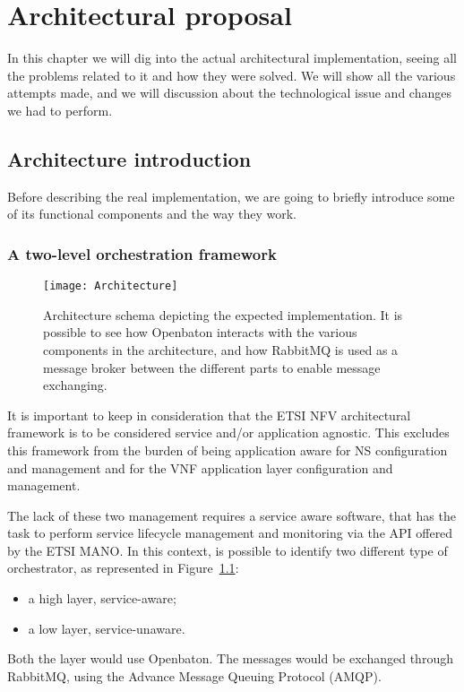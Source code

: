 \chapter{Architectural proposal}
\label{chap:archimpl}
 
In this chapter we will dig into the actual architectural implementation, seeing
all the problems related to it and how they were solved. We will show all the
various attempts made, and we will discussion about the technological issue and
changes we had to perform.

\section{Architecture introduction}
Before describing the real implementation, we are going to briefly introduce
some of its functional components and the way they work.

\subsection{A two-level orchestration framework}
\begin{figure}[t]
  \centering
  \texttt{[image: Architecture]}
  \caption[Architecture schema depicting the expected
    implementation]{Architecture schema depicting the expected implementation.
    It is possible to see how Openbaton interacts with the various components in
    the architecture, and how RabbitMQ is used as a message broker between the
    different parts to enable message exchanging.}
  \label{chap:archimpl:sec:fistattempt:img:architecture}
\end{figure}

It is important to keep in consideration that the ETSI NFV architectural
framework is to be considered service and/or application agnostic. This excludes
this framework from the burden of being application aware for NS configuration
and management and for the VNF application layer configuration and management.

The lack of these two management requires a service aware software, that has the
task to perform service lifecycle management and monitoring via the API offered
by the ETSI MANO. In this context, is possible to identify two different type of
orchestrator, as represented in
Figure~\ref{chap:archimpl:sec:fistattempt:img:architecture}:
\begin{itemize}
\item a high layer, service-aware;
\item a low layer, service-unaware.
\end{itemize}
Both the layer would use Openbaton. The messages would be exchanged through
RabbitMQ, using the Advance Message Queuing Protocol (AMQP).

